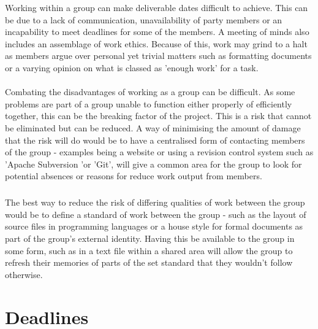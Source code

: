 Working within a group can make deliverable dates difficult to achieve.  This
can be due to a lack of communication, unavailability of party members or an
incapability to meet deadlines for some of the members.  A meeting of minds also
includes an assemblage of work ethics.  Because of this, work may grind to a
halt as members argue over personal yet trivial matters such as formatting
documents or a varying opinion on what is classed as 'enough work' for a task.

\pagebreak

\begin{comment}
Page formatting makes the file look more professional with a page break above.
May be subject to change when this file is absorbed into the amalgamated file.
\end{comment}

\paragraph{}
Combating the disadvantages of working as a group can be difficult.  As some
problems are part of a group unable to function either properly of efficiently
together, this can be the breaking factor of the project.  This is a risk that
cannot be eliminated but can be reduced.  A way of minimising the amount of
damage that the risk will do would be to have a centralised form of contacting
members of the group - examples being a website or using a revision control
system such as 'Apache Subversion 'or 'Git', will give a common area for the
group to look for potential absences or reasons for reduce work output from
members. 

\subparagraph{}

The best way to reduce the risk of differing qualities of work between the group
would be to define a standard of work between the group - such as the layout of
source files in programming languages or a house style for formal documents as
part of the group's external identity.  Having this be available to the group in
some form, such as in a text file within a shared area will allow the group to
refresh their memories of parts of the set standard that they wouldn't follow
otherwise.

\section{Deadlines}
\paragraph{}

